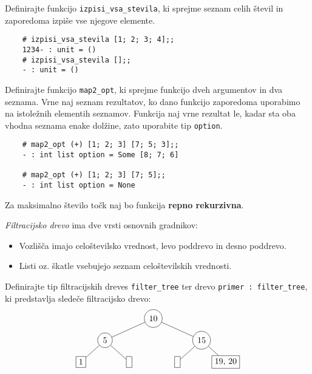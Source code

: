 \documentclass[arhiv]{../izpit}
\begin{document}

\naloga[]

\podnaloga
  Definirajte funkcijo \verb|izpisi_vsa_stevila|, ki sprejme seznam celih števil
  in zaporedoma izpiše vse njegove elemente.

  \begin{verbatim}
    # izpisi_vsa_stevila [1; 2; 3; 4];;
    1234- : unit = ()
    # izpisi_vsa_stevila [];;
    - : unit = ()
  \end{verbatim}

\podnaloga
  Definirajte funkcijo \verb|map2_opt|, ki sprejme funkcijo dveh argumentov
  in dva seznama. Vrne naj seznam rezultatov, ko dano funkcijo zaporedoma
  uporabimo na istoležnih elementih seznamov. Funkcija naj vrne rezultat le,
  kadar sta oba vhodna seznama enake dolžine, zato uporabite tip \verb|option|.
  \begin{verbatim}
    # map2_opt (+) [1; 2; 3] [7; 5; 3];;
    - : int list option = Some [8; 7; 6]

    # map2_opt (+) [1; 2; 3] [7; 5];;
    - : int list option = None
  \end{verbatim}
  Za maksimalno število točk naj bo funkcija \textbf{repno rekurzivna}.


\naloga[]

\emph{Filtracijsko drevo} ima dve vrsti osnovnih gradnikov:
\begin{itemize}
\item Vozlišča imajo celoštevilsko vrednost, levo poddrevo in desno poddrevo.
\item Listi oz. škatle vsebujejo seznam celoštevilskih vrednosti.
\end{itemize}

\podnaloga
  Definirajte tip filtracijskih dreves \verb|filter_tree| ter
  drevo \verb|primer : filter_tree|, ki predstavlja sledeče filtracijsko drevo:
\[
  \begin{tikzpicture}[level distance=0.9cm,
    level 1/.style={sibling distance=4cm},
    level 2/.style={sibling distance=2cm},
    level 3/.style={sibling distance=2cm}
    ]
    \node[circle, draw] {10}
      child {node[circle, draw] {5}
        child {node[rectangle, draw] {1}}
        child {node[rectangle, draw] {\vphantom{1}}}
      }
      child {node[circle, draw] {15}
        child {node[rectangle, draw] {\vphantom{1}}}
        child {node[rectangle, draw] {19, 20}}
      };
  \end{tikzpicture}
\]
\end{document}
